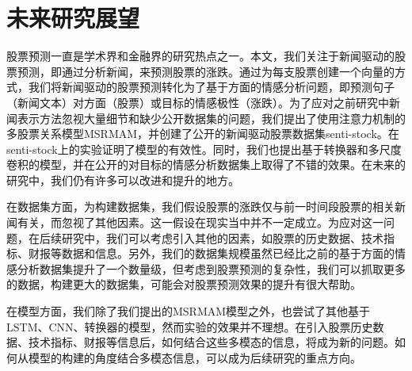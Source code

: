 \section{未来研究展望}

股票预测一直是学术界和金融界的研究热点之一。本文，我们关注于新闻驱动的股票预测，即通过分析新闻，来预测股票的涨跌。通过为每支股票创建一个向量的方式，我们将新闻驱动的股票预测转化为了基于方面的情感分析问题，即预测句子（新闻文本）对方面（股票）或目标的情感极性（涨跌）。为了应对之前研究中新闻表示方法忽视大量细节和缺少公开数据集的问题，我们提出了使用注意力机制的多股票关系模型MSRMAM，并创建了公开的新闻驱动股票数据集senti-stock。在senti-stock上的实验证明了模型的有效性。同时，我们也提出基于转换器和多尺度卷积的模型，并在公开的对目标的情感分析数据集上取得了不错的效果。在未来的研究中，我们仍有许多可以改进和提升的地方。

在数据集方面，为构建数据集，我们假设股票的涨跌仅与前一时间段股票的相关新闻有关，而忽视了其他因素。这一假设在现实当中并不一定成立。为应对这一问题，在后续研究中，我们可以考虑引入其他的因素，如股票的历史数据、技术指标、财报等数据和信息。另外，我们的数据集规模虽然已经比之前的基于方面的情感分析数据集提升了一个数量级，但考虑到股票预测的复杂性，我们可以抓取更多的数据，构建更大的数据集，可能会对股票预测效果的提升有很大帮助。

在模型方面，我们除了我们提出的MSRMAM模型之外，也尝试了其他基于LSTM、CNN、转换器的模型，然而实验的效果并不理想。在引入股票历史数据、技术指标、财报等信息后，如何结合这些多模态的信息，将成为新的问题。如何从模型的构建的角度结合多模态信息，可以成为后续研究的重点方向。